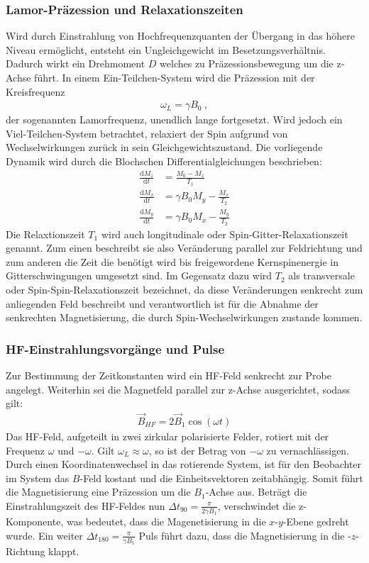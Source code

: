\subsubsection{Lamor-Präzession und Relaxationszeiten}
Wird durch Einstrahlung von Hochfrequenzquanten der Übergang in das höhere Niveau ermöglicht, entsteht ein Ungleichgewicht im Besetzungsverhältnis. Dadurch wirkt ein Drehmoment $D$ welches zu Präzessionsbewegung um die z-Achse führt. In einem Ein-Teilchen-System wird die Präzession mit der Kreisfrequenz 
\begin{align}
	\omega_L=\gamma B_0 \:,
	\label{eq:Lamor}
\end{align}
der sogenannten Lamorfrequenz, unendlich lange fortgesetzt. Wird jedoch ein Viel-Teilchen-System betrachtet, relaxiert der Spin aufgrund von Wechselwirkungen zurück in sein Gleichgewichtszustand. Die vorliegende Dynamik wird durch die Blochschen Differentialgleichungen beschrieben:
\begin{align}
	\frac{\text{d}M_z}{\text{d}t}&=\frac{M_0-M_z}{T_1}\\
	\frac{\text{d}M_x}{\text{d}t}&=\gamma B_0 M_y -\frac{M_x}{T_2}\\
	\frac{\text{d}M_y}{\text{d}t}&=\gamma B_0 M_x -\frac{M_y}{T_2}
	\label{eq:Bloch}
\end{align}
Die Relaxtionszeit $T_1$ wird auch longitudinale oder Spin-Gitter-Relaxationszeit genannt. Zum einen beschreibt sie also Veränderung parallel zur Feldrichtung und zum anderen die Zeit die benötigt wird bis freigewordene Kernspinenergie in Gitterschwingungen umgesetzt sind. Im Gegensatz dazu wird $T_2$ als transversale oder Spin-Spin-Relaxationszeit bezeichnet, da diese Veränderungen senkrecht zum anliegenden Feld beschreibt und verantwortlich ist für die Abnahme der senkrechten Magnetisierung, die durch Spin-Wechselwirkungen zustande kommen.

\subsubsection{HF-Einstrahlungsvorgänge und Pulse}
Zur Bestimmung der Zeitkonstanten wird ein HF-Feld senkrecht zur Probe angelegt. Weiterhin sei die Magnetfeld parallel zur z-Achse ausgerichtet, sodass gilt:
\begin{align}
	\vec{B}_{HF}=2\vec{B}_1 \cos{(\omega t)}
	\label{eq:8}
\end{align}
Das HF-Feld, aufgeteilt in zwei zirkular polarisierte Felder, rotiert mit der Frequenz $\omega$ und $-\omega$. Gilt $\omega_L \approx \omega$, so ist der Betrag von $-\omega$ zu vernachlässigen. Durch einen Koordinatenwechsel in das rotierende System, ist für den Beobachter im System das $B$-Feld kostant und die Einheitsvektoren zeitabhängig. Somit führt die Magnetisierung eine Präzession um die $B_1$-Achse aus. Beträgt die Einstrahlungszeit des HF-Feldes nun $\Delta t_{90}=\frac{\pi}{2\gamma B_1}$, verschwindet die z-Komponente, was bedeutet, dass die Magenetisierung in die $x$-$y$-Ebene gedreht wurde. Ein weiter $\Delta t_{180}=\frac{\pi}{\gamma B_1}$ Puls führt dazu, dass die Magnetisierung in die -$z$-Richtung klappt.

